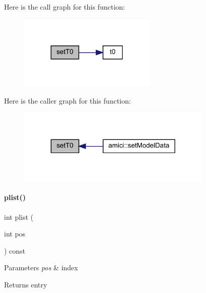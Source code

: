 Here is the call graph for this function\+:
\nopagebreak
\begin{figure}[H]
\begin{center}
\leavevmode
\includegraphics[width=186pt]{classamici_1_1_model_aaf5053fde7e205c89d89c000a7693987_cgraph}
\end{center}
\end{figure}
Here is the caller graph for this function\+:
\nopagebreak
\begin{figure}[H]
\begin{center}
\leavevmode
\includegraphics[width=264pt]{classamici_1_1_model_aaf5053fde7e205c89d89c000a7693987_icgraph}
\end{center}
\end{figure}
\mbox{\label{classamici_1_1_model_a6ac0de1b7dfddbb4a480657f62573563}} 
\paragraph{\texorpdfstring{plist()}{plist()}}
{\footnotesize\ttfamily int plist (\begin{DoxyParamCaption}\item[{int}]{pos }\end{DoxyParamCaption}) const}


\begin{DoxyParams}{Parameters}
{\em pos} & index \\
\hline
\end{DoxyParams}
\begin{DoxyReturn}{Returns}
entry 
\end{DoxyReturn}


